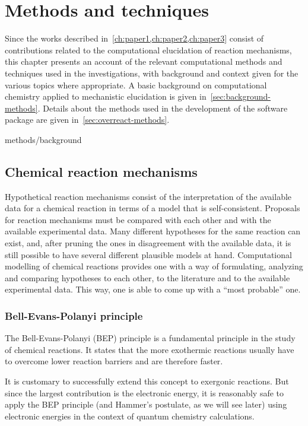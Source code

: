 \chapter{Methods and techniques}%
\label{ch:methods}

Since the works described in~\cref{ch:paper1,ch:paper2,ch:paper3} consist
of contributions related to the computational elucidation of reaction mechanisms,
this chapter presents an account of the relevant computational methods and
techniques used in the investigations, with background and context given
for the various topics where appropriate.
A basic background on computational chemistry applied
to mechanistic elucidation is given in~\cref{sec:background-methods}.
Details about the methods used in the development of the \overreact software
package are given in~\cref{sec:overreact-methods}.

{methods/background}

\section{Chemical reaction mechanisms}

Hypothetical reaction mechanisms consist of
the interpretation of the available data for a chemical reaction
in terms of a model that is self-consistent.
Proposals for reaction mechanisms must be compared
with each other
and with the available experimental data.
Many different hypotheses for the same reaction can exist,
and, after pruning the ones in disagreement with the available data,
it is still possible to have several different plausible models at hand.
Computational modelling of chemical reactions
provides one with a way of
formulating,
analyzing and
comparing hypotheses to each other,
to the literature and to the available experimental data.
This way, one is able to come up with a ``most probable'' one.

\subsection{Bell-Evans-Polanyi principle}

The Bell-Evans-Polanyi (BEP) principle is a fundamental principle in the study
of chemical reactions.
It states that the more exothermic reactions usually have to overcome lower
reaction barriers and are therefore faster.

It is customary to successfully extend this concept to exergonic reactions.
But since the largest contribution is the electronic energy, it is reasonably
safe to apply the BEP principle (and Hammer's postulate, as we will see later)
using electronic energies in the context of quantum chemistry calculations.

